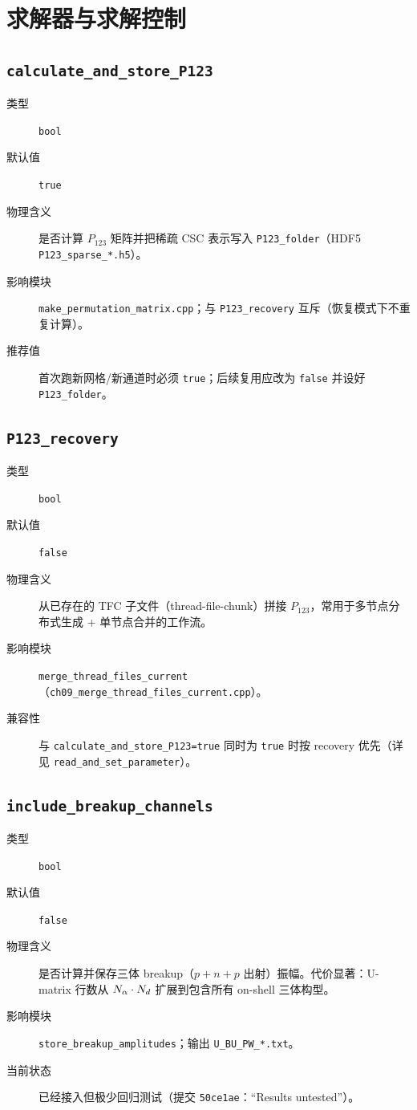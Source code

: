 \section{求解器与求解控制}
\label{sec:appE_solver_ctrl}

\subsection{\texttt{calculate\_and\_store\_P123}}

\begin{description}
  \item[类型] \texttt{bool}
  \item[默认值] \texttt{true}
  \item[物理含义] 是否计算 \(P_{123}\) 矩阵并把稀疏 CSC 表示写入 \texttt{P123\_folder}（HDF5 \texttt{P123\_sparse\_*.h5}）。
  \item[影响模块] \texttt{make\_permutation\_matrix.cpp}；与 \texttt{P123\_recovery} 互斥（恢复模式下不重复计算）。
  \item[推荐值] 首次跑新网格/新通道时必须 \texttt{true}；后续复用应改为 \texttt{false} 并设好 \texttt{P123\_folder}。
\end{description}

\subsection{\texttt{P123\_recovery}}

\begin{description}
  \item[类型] \texttt{bool}
  \item[默认值] \texttt{false}
  \item[物理含义] 从已存在的 TFC 子文件（thread-file-chunk）拼接 \(P_{123}\)，常用于多节点分布式生成 + 单节点合并的工作流。
  \item[影响模块] \texttt{merge\_thread\_files\_current}（\texttt{ch09\_merge\_thread\_files\_current.cpp}）。
  \item[兼容性] 与 \texttt{calculate\_and\_store\_P123=true} 同时为 \texttt{true} 时按 recovery 优先（详见 \texttt{read\_and\_set\_parameter}）。
\end{description}

\subsection{\texttt{include\_breakup\_channels}}

\begin{description}
  \item[类型] \texttt{bool}
  \item[默认值] \texttt{false}
  \item[物理含义] 是否计算并保存三体 breakup（\(p+n+p\) 出射）振幅。代价显著：U-matrix 行数从 \(N_\alpha\cdot N_d\) 扩展到包含所有 on-shell 三体构型。
  \item[影响模块] \texttt{store\_breakup\_amplitudes}；输出 \texttt{U\_BU\_PW\_*.txt}。
  \item[当前状态] 已经接入但极少回归测试（提交 \texttt{50ce1ae}：“Results untested”）。
\end{description}

